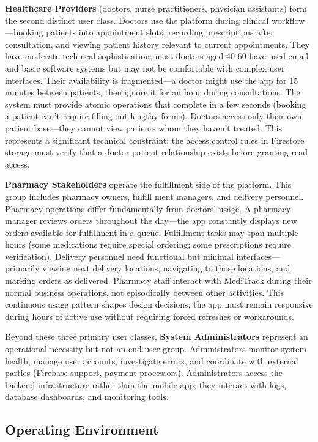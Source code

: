 \documentclass[12pt,a4paper]{report}
\begin{document}
\textbf{Healthcare Providers} (doctors, nurse practitioners, physician assistants) form the second distinct user class. Doctors use the platform during clinical workflow—booking patients into appointment slots, recording prescriptions after consultation, and viewing patient history relevant to current appointments. They have moderate technical sophistication; most doctors aged 40-60 have used email and basic software systems but may not be comfortable with complex user interfaces. Their availability is fragmented—a doctor might use the app for 15 minutes between patients, then ignore it for an hour during consultations. The system must provide atomic operations that complete in a few seconds (booking a patient can't require filling out lengthy forms). Doctors access only their own patient base—they cannot view patients whom they haven't treated. This represents a significant technical constraint; the access control rules in Firestore storage must verify that a doctor-patient relationship exists before granting read access.

\textbf{Pharmacy Stakeholders} operate the fulfillment side of the platform. This group includes pharmacy owners, fulfill ment managers, and delivery personnel. Pharmacy operations differ fundamentally from doctors' usage. A pharmacy manager reviews orders throughout the day—the app constantly displays new orders available for fulfillment in a queue. Fulfillment tasks may span multiple hours (some medications require special ordering; some prescriptions require verification). Delivery personnel need functional but minimal interfaces—primarily viewing next delivery locations, navigating to those locations, and marking orders as delivered. Pharmacy staff interact with MediTrack during their normal business operations, not episodically between other activities. This continuous usage pattern shapes design decisions; the app must remain responsive during hours of active use without requiring forced refreshes or workarounds.

Beyond these three primary user classes, \textbf{System Administrators} represent an operational necessity but not an end-user group. Administrators monitor system health, manage user accounts, investigate errors, and coordinate with external parties (Firebase support, payment processors). Administrators access the backend infrastructure rather than the mobile app; they interact with logs, database dashboards, and monitoring tools.

\subsection{Operating Environment}
\end{document}
